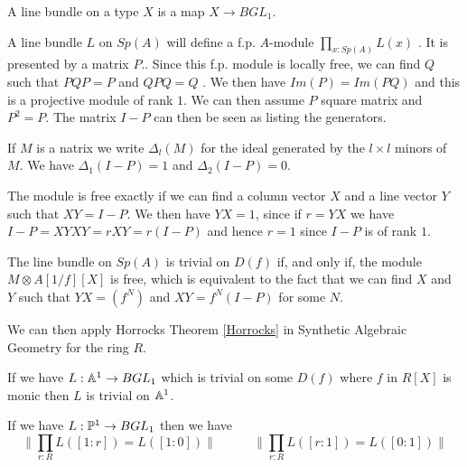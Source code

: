 A line bundle on a type $X$ is a map $X\rightarrow BGL_1$.


\medskip

 A line bundle $L$ on $Sp(A)$ will define a f.p. $A$-module $\prod_{x:Sp(A)}L(x)$ \cite{draft}.
It is presented by a matrix $P$..
Since this f.p. module is locally free, we can find $Q$ such that $PQP = P$ and
$QPQ = Q$ \cite{lombardi-quitte}. We then have $Im(P) = Im(PQ)$ and this is a projective module of rank $1$. We can then assume $P$ square matrix and
$P^2 = P$. The matrix $I-P$ can then be seen as listing the generators.

If $M$ is a natrix we write $\Delta_l(M)$ for the ideal generated by the $l\times l$ minors of
$M$. We have $\Delta_1(I-P) = 1$ and $\Delta_2(I-P) = 0$.

The module is free exactly if we can find a column vector $X$ and a line vector $Y$ such that
$XY = I-P$. We then have $YX = 1$, since if $r = YX$ we have $I-P = XYXY = rXY = r(I-P)$ and
hence $r = 1$ since $I-P$ is of rank $1$.



\medskip


The line bundle on $Sp(A)$ is trivial on $D(f)$ if, and only if, the module $M\otimes A[1/f][X]$ is free, which
is equivalent to the fact that we can find $X$ and $Y$ such that $YX = (f^N)$ and $XY = f^N(I-P)$ for some $N$.

We can then apply Horrocks Theorem \ref{Horrocks} in Synthetic Algebraic Geometry for the ring $R$.

\begin{proposition}
  If we have $L:\mathbb{A}^1\rightarrow BGL_1$ which is trivial on some $D(f)$ where $f$ in $R[X]$ is monic
  then $L$ is trivial on $\mathbb{A}^1$.
\end{proposition}

\begin{corollary}\label{c1}
  If we have $L:\mathbb{P}^1\rightarrow BGL_1$ then we have
  $$\|{\prod_{r:R}L([1:r]) = L([1:0])}\|~~~~~~~~~~~~~\|{\prod_{r:R}L([r:1]) = L([0:1])}\|$$
\end{corollary}
